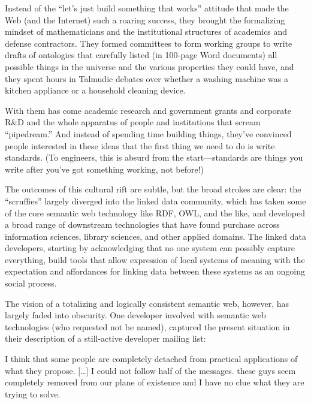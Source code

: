 \begin{leftbar}
Instead of the ``let's just build something that works'' attitude that
made the Web (and the Internet) such a roaring success, they brought the
formalizing mindset of mathematicians and the institutional structures
of academics and defense contractors. They formed committees to form
working groups to write drafts of ontologies that carefully listed (in
100-page Word documents) all possible things in the universe and the
various properties they could have, and they spent hours in Talmudic
debates over whether a washing machine was a kitchen appliance or a
household cleaning device.

With them has come academic research and government grants and corporate
R\&D and the whole apparatus of people and institutions that scream
``pipedream.'' And instead of spending time building things, they've
convinced people interested in these ideas that the first thing we need
to do is write standards. (To engineers, this is absurd from the
start---standards are things you write after you've got something
working, not before!) \citep{swartzAaronSwartzProgrammable2013} 
\end{leftbar}

The outcomes of this cultural rift are subtle, but the broad strokes are
clear: the ``scruffies'' largely diverged into the linked data
community, which has taken some of the core semantic web technology like
RDF, OWL, and the like, and developed a broad range of downstream
technologies that have found purchase across information sciences,
library sciences, and other applied domains. The linked data developers, starting
by acknowledging that no one system can possibly capture everything,
build tools that allow expression of local systems of meaning with the
expectation and affordances for linking data between these systems as an
ongoing social process.

The vision of a totalizing and logically consistent semantic web,
however, has largely faded into obscurity. One developer involved with
semantic web technologies (who requested not be named), captured the
present situation in their description of a still-active developer
mailing list:

\begin{leftbar}
I think that some people are completely detached from practical
applications of what they propose. {[}\ldots{]} I could not follow half
of the messages. these guys seem completely removed from our plane of
existence and I have no clue what they are trying to solve.
\end{leftbar}

